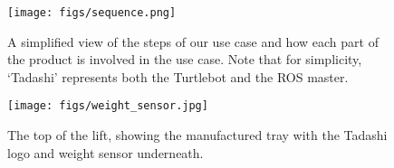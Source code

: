 \documentclass{article}
\begin{document}
\begin{figure}
  \begin{center}
    \texttt{[image: figs/sequence.png]}
  \end{center}
  \caption{A simplified view of the steps of our use case and how each part of the product is involved in the use case. Note that for simplicity, `Tadashi' represents both the Turtlebot and the ROS master.}
  \label{fig:seq}
\end{figure}
\begin{figure}
  \begin{center}
    \texttt{[image: figs/weight\_sensor.jpg]}
    \caption{The top of the lift, showing the manufactured tray with the Tadashi logo and weight sensor underneath.}
  \label{fig:sensor}
  \end{center}
\end{figure}
\end{document}
